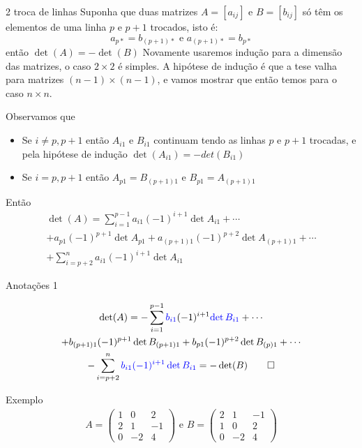 \documentclass{beamer}
\begin{document}
\begin{frame}{2 troca de linhas}
  Suponha que duas matrizes $A=[a_{ij}]$ e $B=[b_{ij}]$ só têm os elementos de uma linha $p$ e $p+1$ trocados, isto
  é:
  $$ a_{p*}=b_{(p+1)*} \text { e } a_{(p+1)*} = b_{p*}$$
  então $\det(A)=-\det(B)$
  Novamente usaremos indução para a dimensão das matrizes,
  o caso $2 \times 2$ é simples. A hipótese de indução é que a tese 
  valha para matrizes $(n-1)\times (n-1)$, e vamos mostrar que 
  então temos para o caso $n\times n$.
\end{frame}
\begin{frame}{}
  Observamos que
  \begin{itemize}
    \item Se $i\neq p, p+1$ então $A_{i1}$ e $B_{i1}$ continuam tendo as linhas $p$ e $p+1$ trocadas, e pela hipótese de indução $\det(A_{i1})=-det(B_{i1})$
    \item Se $ i=p,p+1 $ então $A_{p1}=B_{(p+1)1}$ e $B_{p1} = A_{(p+1)1}$
  \end{itemize}
  Então 
  \begin{gather*}\det(A) = \sum_{i=1}^{p-1}a_{i1}(-1)^{i+1}\det{A_{i1}} + \cdots \\
    +a_{p1}(-1)^{p+1}\det{A_{p1}} + a_{(p+1)1}(-1)^{p+2}\det{A_{(p+1)1}} + \cdots \\
  + \sum_{i=p+2}^{n}a_{i1}(-1)^{i+1}\det{A_{i1}}\end{gather*}
\end{frame}

\begin{frame}{Anotações 1}
  
\end{frame}
 
\begin{frame}
  \begin{gather*}\det(A) = -\sum_{i=1}^{p-1}\textcolor{blue}{b_{i1}}(-1)^{i+1}\textcolor{blue}{\det{B_{i1}}} + \cdots \\
    +b_{(p+1)1}(-1)^{p+1}\det{B_{(p+1)1}} + b_{p1}(-1)^{p+2}\det{B_{(p)1}} + \cdots \\
  -\sum_{i=p+2}^{n}\textcolor{blue}{b_{i1}(-1)^{i+1}\det{B_{i1}}}=-\det(B) \qed \end{gather*}
\end{frame}

\begin{frame}{Exemplo}
  \begin{gather*}
    A =\begin{pmatrix}
      1 & 0 & 2 \\ 2 & 1 & -1 \\ 0 & -2 & 4 
    \end{pmatrix}\text{ e } B=\begin{pmatrix}
      2 & 1 & -1 \\ 
      1 & 0 & 2 \\ 
      0 & -2 & 4 
    \end{pmatrix}
  \end{gather*}
  
\end{frame}
\end{document}
